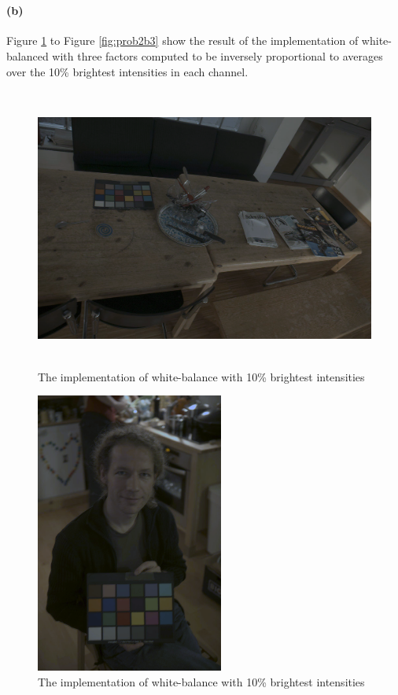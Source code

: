 \documentclass{article}
\newcommand{\spart}[1]{\paragraph{(#1)}}
\begin{document}
\

\spart{b} Figure \ref{fig:prob2b1} to Figure \ref{fig:prob2b3} show the result of the implementation of white-balanced with three factors computed to be inversely proportional to averages over the 10\% brightest intensities in each channel.

\begin{figure}[!h]
  \centering
    \includegraphics[height=25em]{code/outputs/prob2b_1.png}
  \caption{The implementation of white-balance with 10\% brightest intensities}
  \label{fig:prob2b1}
\end{figure}

\begin{figure}[!h]
  \centering
    \includegraphics[height=25em]{code/outputs/prob2b_2.png}
  \caption{The implementation of white-balance with 10\% brightest intensities}
  \label{fig:prob2b2}
\end{figure}
\end{document}
